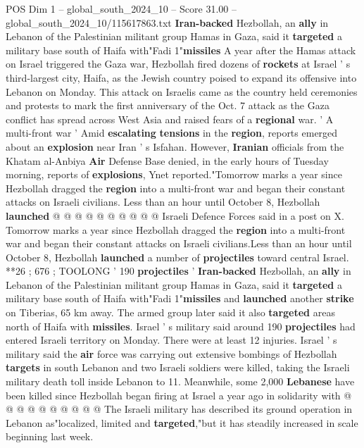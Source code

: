 \begin{textsample}{POS Dim 1 – global\_south\_2024\_10 – Score 31.00 – global\_south\_2024\_10/115617863.txt}  \label{ex:f1_pos_028}
\textbf{Iran-backed} Hezbollah, an \textbf{ally} in Lebanon of the Palestinian militant group Hamas in Gaza, said it \textbf{targeted} a military base south of Haifa with"Fadi 1"\textbf{missiles} A year after the Hamas attack on Israel triggered the Gaza war, Hezbollah fired dozens of \textbf{rockets} at Israel ' s third-largest city, Haifa, as the Jewish country poised to expand its offensive into Lebanon on Monday.
This attack on Israelis came as the country held ceremonies and protests to mark the first anniversary of the Oct. 7 attack as the Gaza conflict has spread across West Asia and raised fears of a \textbf{regional} war. ' A multi-front war ' Amid \textbf{escalating} \textbf{tensions} in the \textbf{region}, reports emerged about an \textbf{explosion} near Iran ' s Isfahan.
However, \textbf{Iranian} officials from the Khatam al-Anbiya \textbf{Air} Defense Base denied, in the early hours of Tuesday morning, reports of \textbf{explosions}, Ynet reported."Tomorrow marks a year since Hezbollah dragged the \textbf{region} into a multi-front war and began their constant attacks on Israeli civilians.
Less than an hour until October 8, Hezbollah \textbf{launched} @ @ @ @ @ @ @ @ @ @ Israeli Defence Forces said in a post on X.
Tomorrow marks a year since Hezbollah dragged the \textbf{region} into a multi-front war and began their constant attacks on Israeli civilians.Less than an hour until October 8, Hezbollah \textbf{launched} a number of \textbf{projectiles} toward central Israel. **26 ; 676 ; TOOLONG ' 190 \textbf{projectiles} ' \textbf{Iran-backed} Hezbollah, an \textbf{ally} in Lebanon of the Palestinian militant group Hamas in Gaza, said it \textbf{targeted} a military base south of Haifa with"Fadi 1"\textbf{missiles} and \textbf{launched} another \textbf{strike} on Tiberias, 65 km away.
The armed group later said it also \textbf{targeted} areas north of Haifa with \textbf{missiles}.
Israel ' s military said around 190 \textbf{projectiles} had entered Israeli territory on Monday.
There were at least 12 injuries.
Israel ' s military said the \textbf{air} force was carrying out extensive bombings of Hezbollah \textbf{targets} in south Lebanon and two Israeli soldiers were killed, taking the Israeli military death toll inside Lebanon to 11.
Meanwhile, some 2,000 \textbf{Lebanese} have been killed since Hezbollah began firing at Israel a year ago in solidarity with @ @ @ @ @ @ @ @ @ @ The Israeli military has described its ground operation in Lebanon as"localized, limited and \textbf{targeted},"but it has steadily increased in scale beginning last week.

\end{textsample}
